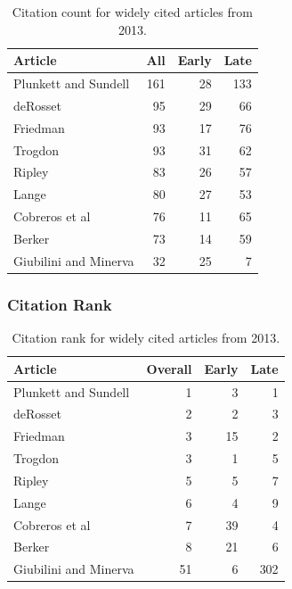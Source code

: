 \documentclass[
  10pt,
  letterpaper,
  DIV=11,
  numbers=noendperiod,
  twoside]{scrartcl}
\begin{document}
\begin{longtable}[]{@{}lrrr@{}}

\caption{\label{tbl-citation-count-2013}Citation count for widely cited
articles from 2013.}

\tabularnewline

\toprule\noalign{}
Article & All & Early & Late \\
\midrule\noalign{}
\endhead
\bottomrule\noalign{}
\endlastfoot
Plunkett and Sundell & 161 & 28 & 133 \\
deRosset & 95 & 29 & 66 \\
Friedman & 93 & 17 & 76 \\
Trogdon & 93 & 31 & 62 \\
Ripley & 83 & 26 & 57 \\
Lange & 80 & 27 & 53 \\
Cobreros et al & 76 & 11 & 65 \\
Berker & 73 & 14 & 59 \\
Giubilini and Minerva & 32 & 25 & 7 \\

\end{longtable}

\subsubsection*{Citation Rank}\label{sec-rank-2013}

\begin{longtable}[]{@{}lrrr@{}}

\caption{\label{tbl-citation-rank-2013}Citation rank for widely cited
articles from 2013.}

\tabularnewline

\toprule\noalign{}
Article & Overall & Early & Late \\
\midrule\noalign{}
\endhead
\bottomrule\noalign{}
\endlastfoot
Plunkett and Sundell & 1 & 3 & 1 \\
deRosset & 2 & 2 & 3 \\
Friedman & 3 & 15 & 2 \\
Trogdon & 3 & 1 & 5 \\
Ripley & 5 & 5 & 7 \\
Lange & 6 & 4 & 9 \\
Cobreros et al & 7 & 39 & 4 \\
Berker & 8 & 21 & 6 \\
Giubilini and Minerva & 51 & 6 & 302 \\

\end{longtable}
\end{document}
